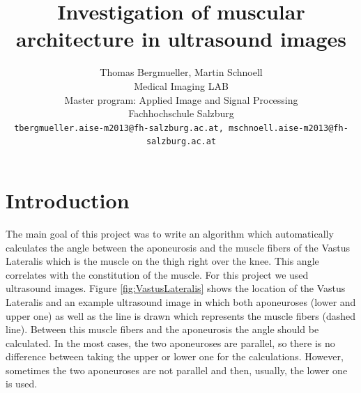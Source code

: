 \documentclass[10pt,twocolumn,letterpaper]{article}
\begin{document}
\title{Investigation of muscular architecture in ultrasound images}

\author{Thomas Bergmueller, Martin Schnoell\\
Medical Imaging LAB\\
Master program: Applied Image and Signal Processing\\
Fachhochschule Salzburg\\
{\tt\small tbergmueller.aise-m2013@fh-salzburg.ac.at, mschnoell.aise-m2013@fh-salzburg.ac.at}
}

\maketitle
\thispagestyle{empty}



\section{Introduction}
The main goal of this project was to write an algorithm which automatically calculates the angle between the aponeurosis and the muscle fibers of the Vastus Lateralis which is the muscle on the thigh right over the knee. This angle correlates with the constitution of the muscle.
For this project we used ultrasound images.  
Figure \ref{fig:VastusLateralis} shows the location of the Vastus Lateralis and an example ultrasound image in which both aponeuroses (lower and upper one) as well as the line is drawn which represents the muscle fibers (dashed line). Between this muscle fibers and the aponeurosis the angle should be calculated. In the most cases, the two aponeuroses are parallel, so there is no difference between taking the upper or lower one for the calculations. However, sometimes the two aponeuroses are not parallel and then, usually, the lower one is used. 
\end{document}
